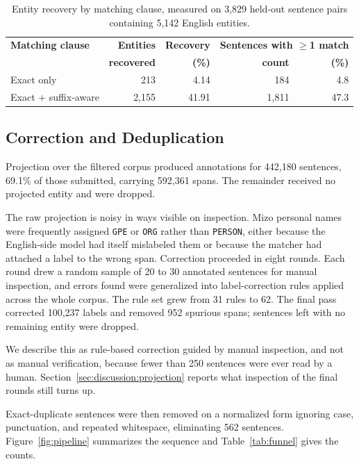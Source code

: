\documentclass[acmsmall,screen,review]{acmart}
\begin{document}
\begin{table}[htbp]
\centering
\caption{Entity recovery by matching clause, measured on 3,829 held-out
sentence pairs containing 5,142 English entities.}
\label{tab:projection_recovery}
\begin{tabular}{lrrrr}
\hline
\textbf{Matching clause} & \textbf{Entities} & \textbf{Recovery} & \multicolumn{2}{c}{\textbf{Sentences with $\geq$1 match}} \\
                         & \textbf{recovered} & \textbf{(\%)}    & \textbf{count} & \textbf{(\%)} \\
\hline
Exact only            &   213 &  4.14 &   184 &  4.8 \\
Exact + suffix-aware  & 2,155 & 41.91 & 1,811 & 47.3 \\
\hline
\end{tabular}
\end{table}

\subsection{Correction and Deduplication}
\label{sec:corpus:correction}

Projection over the filtered corpus produced annotations for 442,180 sentences,
69.1\% of those submitted, carrying 592,361 spans. The remainder received no
projected entity and were dropped.

The raw projection is noisy in ways visible on inspection. Mizo personal names
were frequently assigned \texttt{GPE} or \texttt{ORG} rather than
\texttt{PERSON}, either because the English-side model had itself mislabeled
them or because the matcher had attached a label to the wrong span. Correction
proceeded in eight rounds. Each round drew a random sample of 20 to 30 annotated
sentences for manual inspection, and errors found were generalized into
label-correction rules applied across the whole corpus. The rule set grew from
31 rules to 62. The final pass corrected 100,237 labels and removed 952 spurious
spans; sentences left with no remaining entity were dropped.

We describe this as rule-based correction guided by manual inspection, and not
as manual verification, because fewer than 250 sentences were ever read by a
human. Section~\ref{sec:discussion:projection} reports what inspection of the
final rounds still turns up.

Exact-duplicate sentences were then removed on a normalized form ignoring case,
punctuation, and repeated whitespace, eliminating 562 sentences.
Figure~\ref{fig:pipeline} summarizes the sequence and Table~\ref{tab:funnel}
gives the counts.
\end{document}
